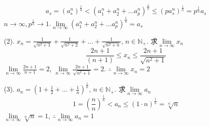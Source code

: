	\begin{equation*}\label{ex2.2.4Ex2}
		a_s = (a_s^n)^\frac{1}{n}
		<
		(a_1^n+a_2^n+\dots a_p^n)^\frac{1}{n}
		\leqslant
		(p a_s^n)^\frac{1}{n}=p^\frac{1}{n}a_s
	\end{equation*}
$ n\rightarrow\infty, p^\frac{1}{n}\rightarrow 1 $.$ \lim\limits_{n\rightarrow\infty}(a_1^n+a_2^n+\dots a_p^n)^\frac{1}{n} = a_s $

(2). $ x_n= \frac{1}{\sqrt{n^2+1}}+\frac{1}{\sqrt{n^2+2}}+\dots+\frac{1}{\sqrt{n^2+n}} $, $ n\in \mathbb{N}_+ $. 求$ \lim\limits_{n\rightarrow\infty} x_n $
\begin{equation*}
	\frac{2n+1}{(n+1)}\leqslant x_n\leqslant \frac{2n+1}{\sqrt{n^2+1}}
\end{equation*}
$ \lim\limits_{n\rightarrow\infty}\frac{2n+1}{n+1}=2 $, 
$ \lim\limits_{n\rightarrow\infty}\frac{2n+1}{\sqrt{n^2+1}}=2 $.
$ \therefore \lim\limits_{n\rightarrow\infty} x_n = 2 $

(3). $ a_n = (1+\frac{1}{2}+\dots+\frac{1}{n})^{\frac{1}{n}} $, $ n\in\mathbb{N}_+ $. 求$ \lim\limits_{n\rightarrow\infty}a_n $
	\begin{equation*}
		1=(\frac{n}{n})^\frac{1}{n} < a_n \leqslant (1\cdot n)^\frac{1}{n}=\sqrt[n]{n}
	\end{equation*}
$ \lim\limits_{n\rightarrow\infty} \sqrt[n]{n}=1 $, $ \therefore \lim\limits_{n\rightarrow\infty} a_n = 1$
